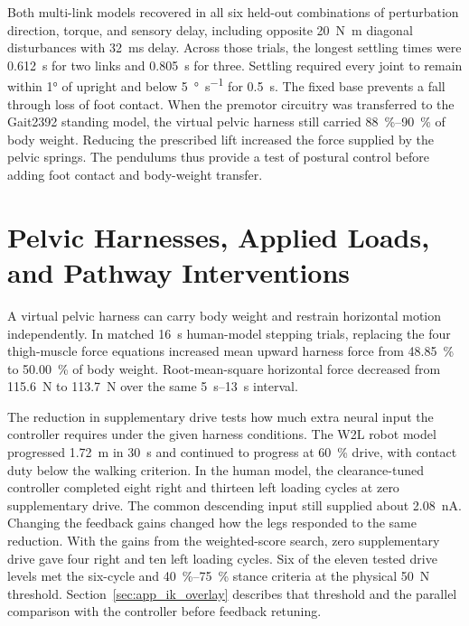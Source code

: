 Both multi-link models recovered in all six held-out combinations of perturbation direction, torque, and sensory delay, including opposite \qty{20}{\newton\meter} diagonal disturbances with \qty{32}{\milli\second} delay. Across those trials, the longest settling times were \qty{0.612}{\second} for two links and \qty{0.805}{\second} for three. Settling required every joint to remain within \ang{1} of upright and below \qty{5}{\degree\per\second} for \qty{0.5}{\second}. The fixed base prevents a fall through loss of foot contact. When the premotor circuitry was transferred to the Gait2392 standing model, the virtual pelvic harness still carried \qtyrange{88}{90}{\percent} of body weight. Reducing the prescribed lift increased the force supplied by the pelvic springs. The pendulums thus provide a test of postural control before adding foot contact and body-weight transfer.

\section{Pelvic Harnesses, Applied Loads, and Pathway Interventions}\label{sec:sns_controller_comparison}

A virtual pelvic harness can carry body weight and restrain horizontal motion independently. In matched \qty{16}{\second} human-model stepping trials, replacing the four thigh-muscle force equations increased mean upward harness force from \qty{48.85}{\percent} to \qty{50.00}{\percent} of body weight. Root-mean-square horizontal force decreased from \qty{115.6}{\newton} to \qty{113.7}{\newton} over the same \qtyrange{5}{13}{\second} interval.

The reduction in supplementary drive tests how much extra neural input the controller requires under the given harness conditions. The W2L robot model progressed \qty{1.72}{\meter} in \qty{30}{\second} and continued to progress at \qty{60}{\percent} drive, with contact duty below the walking criterion. In the human model, the clearance-tuned controller completed eight right and thirteen left loading cycles at zero supplementary drive. The common descending input still supplied about \qty{2.08}{\nano\ampere}. Changing the feedback gains changed how the legs responded to the same reduction. With the gains from the weighted-score search, zero supplementary drive gave four right and ten left loading cycles. Six of the eleven tested drive levels met the six-cycle and \qtyrange{40}{75}{\percent} stance criteria at the physical \qty{50}{\newton} threshold. Section~\ref{sec:app_ik_overlay} describes that threshold and the parallel comparison with the controller before feedback retuning.

